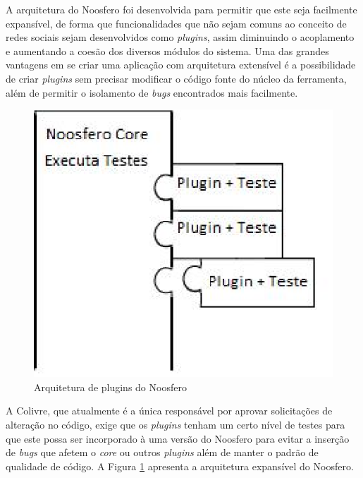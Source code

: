 
A arquitetura do Noosfero foi desenvolvida para permitir que este seja facilmente
expansível, de forma que funcionalidades que não sejam comuns ao conceito de
redes sociais sejam desenvolvidos como \textit{plugins}, assim diminuindo
o acoplamento e aumentando a coesão dos diversos módulos do sistema.
%
Uma das grandes vantagens em se criar uma aplicação com arquitetura extensível
é a possibilidade de criar \textit{plugins} sem precisar modificar o código
fonte do núcleo da ferramenta, além de permitir o isolamento de
\textit{bugs} encontrados mais facilmente. 

\begin{figure}[h]
	\centering
	\includegraphics[keepaspectratio=true,scale=0.6]{figuras/plugins.eps}
	\caption{Arquitetura de plugins do Noosfero}
	\label{plugins}
\end{figure}

A Colivre, que atualmente é a única responsável por aprovar solicitações de
alteração no código, exige que os \textit{plugins} tenham um certo nível de
testes para que este possa ser incorporado à uma versão do Noosfero para
evitar a inserção de \textit{bugs} que afetem o \textit{core} ou
outros \textit{plugins} além de manter o padrão de qualidade de código. A
Figura \ref{plugins} apresenta a arquitetura expansível do Noosfero.

